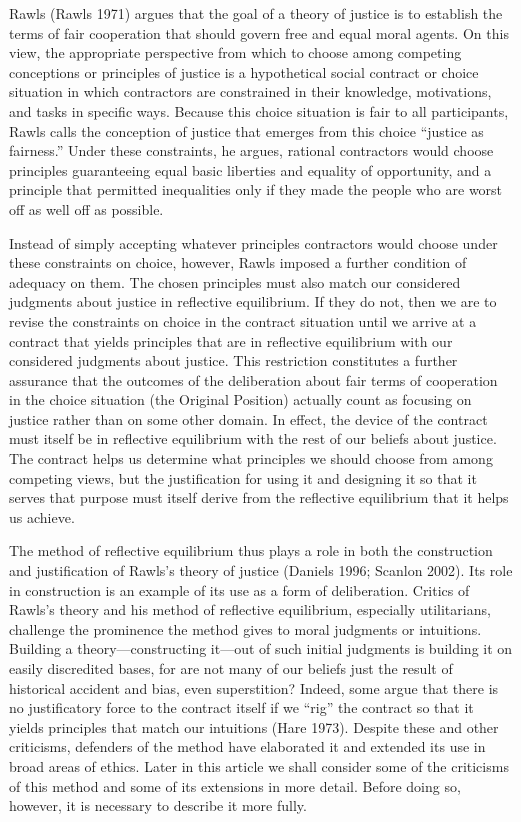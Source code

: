 \documentclass[]{article}
\begin{document}
Rawls (Rawls 1971) argues that the goal of a theory of justice is to
establish the terms of fair cooperation that should govern free and
equal moral agents. On this view, the appropriate perspective from which
to choose among competing conceptions or principles of justice is a
hypothetical social contract or choice situation in which contractors
are constrained in their knowledge, motivations, and tasks in specific
ways. Because this choice situation is fair to all participants, Rawls
calls the conception of justice that emerges from this choice ``justice
as fairness.'' Under these constraints, he argues, rational contractors
would choose principles guaranteeing equal basic liberties and equality
of opportunity, and a principle that permitted inequalities only if they
made the people who are worst off as well off as possible.

Instead of simply accepting whatever principles contractors would choose
under these constraints on choice, however, Rawls imposed a further
condition of adequacy on them. The chosen principles must also match our
considered judgments about justice in reflective equilibrium. If they do
not, then we are to revise the constraints on choice in the contract
situation until we arrive at a contract that yields principles that are
in reflective equilibrium with our considered judgments about justice.
This restriction constitutes a further assurance that the outcomes of
the deliberation about fair terms of cooperation in the choice situation
(the Original Position) actually count as focusing on justice rather
than on some other domain. In effect, the device of the contract must
itself be in reflective equilibrium with the rest of our beliefs about
justice. The contract helps us determine what principles we should
choose from among competing views, but the justification for using it
and designing it so that it serves that purpose must itself derive from
the reflective equilibrium that it helps us achieve.

The method of reflective equilibrium thus plays a role in both the
construction and justification of Rawls's theory of justice (Daniels
1996; Scanlon 2002). Its role in construction is an example of its use
as a form of deliberation. Critics of Rawls's theory and his method of
reflective equilibrium, especially utilitarians, challenge the
prominence the method gives to moral judgments or intuitions. Building a
theory---constructing it---out of such initial judgments is building it
on easily discredited bases, for are not many of our beliefs just the
result of historical accident and bias, even superstition? Indeed, some
argue that there is no justificatory force to the contract itself if we
``rig'' the contract so that it yields principles that match our
intuitions (Hare 1973). Despite these and other criticisms, defenders of
the method have elaborated it and extended its use in broad areas of
ethics. Later in this article we shall consider some of the criticisms
of this method and some of its extensions in more detail. Before doing
so, however, it is necessary to describe it more fully.
\end{document}
